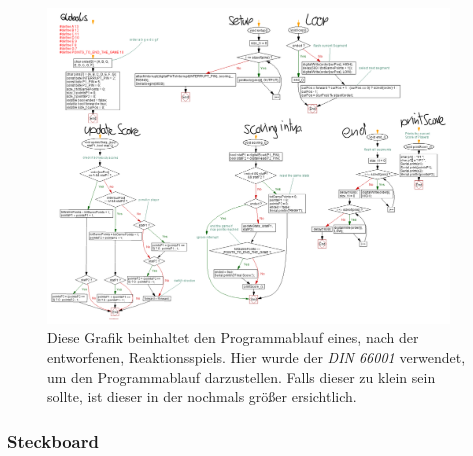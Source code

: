 \documentclass[12pt,english,ngerman]{scrartcl}
\begin{document}
\begin{figure}[H]
  \begin{center}
  \includegraphics[width=0.95\textwidth]{figures/sim/papgame.pdf}
  \end{center}
  \caption{Diese Grafik beinhaltet den Programmablauf eines, nach der
   entworfenen, Reaktionsspiels. Hier
  wurde der \textit{DIN 66001} verwendet, um den Programmablauf
  darzustellen. Falls dieser zu klein sein sollte, ist dieser in der  nochmals größer ersichtlich.}
  \label{fig:pap_game}
\end{figure}


\subsubsection{Steckboard}
\end{document}
